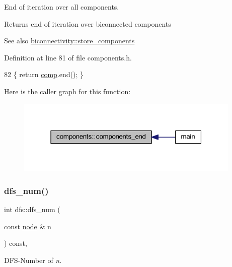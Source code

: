 End of iteration over all components. 

\begin{DoxyReturn}{Returns}
end of iteration over biconnected components 
\end{DoxyReturn}
\begin{DoxySeeAlso}{See also}
\mbox{\hyperlink{classbiconnectivity_a1234e7a70f50fd60c855529fe6fa4acb}{biconnectivity\+::store\+\_\+components}} 
\end{DoxySeeAlso}


Definition at line 81 of file components.\+h.


\begin{DoxyCode}
82     \{ \textcolor{keywordflow}{return} \mbox{\hyperlink{classcomponents_a99483a9e5f031e6e6e2e5b0c47c2979e}{comp}}.end(); \}
\end{DoxyCode}
Here is the caller graph for this function\+:\nopagebreak
\begin{figure}[H]
\begin{center}
\leavevmode
\includegraphics[width=304pt]{classcomponents_a8537c6e4c6a29a4ae05a937b5fda1fb9_icgraph}
\end{center}
\end{figure}
\mbox{\label{classdfs_a315f16831a0bd333960e87e045cb37c8}} 
\subsubsection{\texorpdfstring{dfs\+\_\+num()}{dfs\_num()}}
{\footnotesize\ttfamily int dfs\+::dfs\+\_\+num (\begin{DoxyParamCaption}\item[{const \mbox{\hyperlink{classnode}{node}} \&}]{n }\end{DoxyParamCaption}) const\hspace{0.3cm}{\ttfamily [inline]}, {\ttfamily [inherited]}}



D\+F\+S-\/\+Number of {\itshape n}. 

